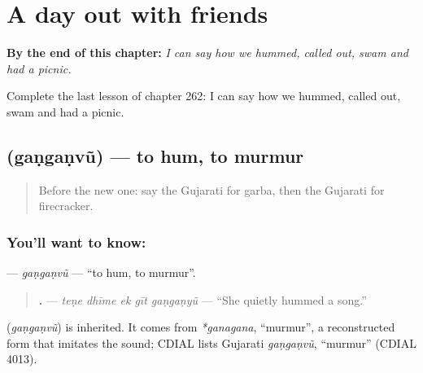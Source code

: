 
\chapter{A day out with friends}
\label{ch:gu-a-day-out-with-friends}

\begin{chapteropening}
\textbf{By the end of this chapter:} \emph{I can say how we hummed, called out, swam and had a picnic.}

Complete the last lesson of chapter 262: I can say how we hummed, called out, swam and had a picnic.
\end{chapteropening}

\section[\texorpdfstring{\gu{ગણગણવું} (gaṇgaṇvũ)}{ગણગણવું (gaṇgaṇvũ)}]{ (gaṇgaṇvũ) — to hum, to murmur}

\label{lesson:GU-C262-ganganvu}



\begin{quote}
Before the new one: say the Gujarati for garba, then the Gujarati for firecracker.
\end{quote}

\subsection*{You'll want to know: }
\textbf{} — \emph{gaṇgaṇvũ} — \textquotedblleft{}to hum, to murmur\textquotedblright{}.

\begin{quote}
\textbf{    .} — \emph{teṇe dhīme ek gīt gaṇgaṇyũ} — \textquotedblleft{}She quietly hummed a song.\textquotedblright{}
\end{quote}

\begin{cousinweb}
\textbf{} (\emph{gaṇgaṇvũ}) is inherited. It comes from \emph{*ganagana}, \textquotedblleft{}murmur\textquotedblright{}, a reconstructed form that imitates the sound; CDIAL lists Gujarati \emph{gaṇgaṇvũ}, \textquotedblleft{}murmur\textquotedblright{} (CDIAL 4013).
\end{cousinweb}

